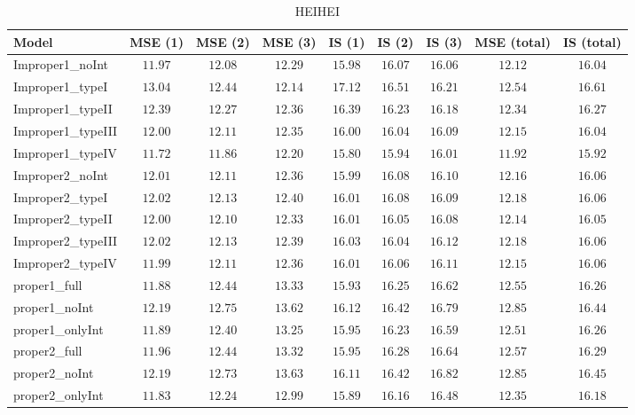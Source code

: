 \begin{table}

\caption{\label{tab:model-choice-sc12}HEIHEI}
\centering
\begin{tabular}{lcccccccc}
\hline
Model  & MSE (1) & MSE (2) & MSE (3) & IS (1) & IS (2) & IS (3) & MSE (total) & \multicolumn{1}{c}{IS (total)} \\ 
\hline
Improper1_noInt  & $11.97$ & $12.08$ & $12.29$ & $15.98$ & $16.07$ & $16.06$ & $12.12$ & $16.04$ \\
Improper1_typeI  & $13.04$ & $12.44$ & $12.14$ & $17.12$ & $16.51$ & $16.21$ & $12.54$ & $16.61$ \\
Improper1_typeII  & $12.39$ & $12.27$ & $12.36$ & $16.39$ & $16.23$ & $16.18$ & $12.34$ & $16.27$ \\
Improper1_typeIII  & $12.00$ & $12.11$ & $12.35$ & $16.00$ & $16.04$ & $16.09$ & $12.15$ & $16.04$ \\
Improper1_typeIV  & $11.72$ & $11.86$ & $12.20$ & $15.80$ & $15.94$ & $16.01$ & $11.92$ & $15.92$ \\
Improper2_noInt  & $12.01$ & $12.11$ & $12.36$ & $15.99$ & $16.08$ & $16.10$ & $12.16$ & $16.06$ \\
Improper2_typeI  & $12.02$ & $12.13$ & $12.40$ & $16.01$ & $16.08$ & $16.09$ & $12.18$ & $16.06$ \\
Improper2_typeII  & $12.00$ & $12.10$ & $12.33$ & $16.01$ & $16.05$ & $16.08$ & $12.14$ & $16.05$ \\
Improper2_typeIII  & $12.02$ & $12.13$ & $12.39$ & $16.03$ & $16.04$ & $16.12$ & $12.18$ & $16.06$ \\
Improper2_typeIV  & $11.99$ & $12.11$ & $12.36$ & $16.01$ & $16.06$ & $16.11$ & $12.15$ & $16.06$ \\
proper1_full  & $11.88$ & $12.44$ & $13.33$ & $15.93$ & $16.25$ & $16.62$ & $12.55$ & $16.26$ \\
proper1_noInt  & $12.19$ & $12.75$ & $13.62$ & $16.12$ & $16.42$ & $16.79$ & $12.85$ & $16.44$ \\
proper1_onlyInt  & $11.89$ & $12.40$ & $13.25$ & $15.95$ & $16.23$ & $16.59$ & $12.51$ & $16.26$ \\
proper2_full  & $11.96$ & $12.44$ & $13.32$ & $15.95$ & $16.28$ & $16.64$ & $12.57$ & $16.29$ \\
proper2_noInt  & $12.19$ & $12.73$ & $13.63$ & $16.11$ & $16.42$ & $16.82$ & $12.85$ & $16.45$ \\
proper2_onlyInt  & $11.83$ & $12.24$ & $12.99$ & $15.89$ & $16.16$ & $16.48$ & $12.35$ & $16.18$ \\
\hline 
\end{tabular}


\end{table}